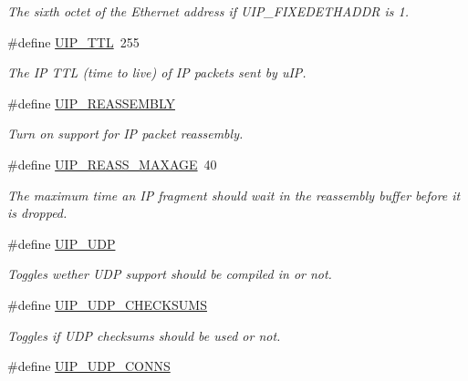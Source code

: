 \begin{CompactItemize}
\begin{CompactList}\small\item\em The sixth octet of the Ethernet address if UIP\_\-FIXEDETHADDR is 1. \item\end{CompactList}\item 
\#define \hyperlink{a00072_gb61381673de27f31848c5396bf0b338e}{UIP\_\-TTL}~255
\begin{CompactList}\small\item\em The IP TTL (time to live) of IP packets sent by u\-IP. \item\end{CompactList}\item 
\#define \hyperlink{a00072_gf963fdea2b75d27ef31e92d1d01359ee}{UIP\_\-REASSEMBLY}
\begin{CompactList}\small\item\em Turn on support for IP packet reassembly. \item\end{CompactList}\item 
\hypertarget{a00072_gc3882366feda1cb759ccbfe98327a7db}{
\#define \hyperlink{a00072_gc3882366feda1cb759ccbfe98327a7db}{UIP\_\-REASS\_\-MAXAGE}~40}
\label{a00072_gc3882366feda1cb759ccbfe98327a7db}

\begin{CompactList}\small\item\em The maximum time an IP fragment should wait in the reassembly buffer before it is dropped. \item\end{CompactList}\item 
\hypertarget{a00073_gdcf372ff9748996f7c05e9822a615384}{
\#define \hyperlink{a00073_gdcf372ff9748996f7c05e9822a615384}{UIP\_\-UDP}}
\label{a00073_gdcf372ff9748996f7c05e9822a615384}

\begin{CompactList}\small\item\em Toggles wether UDP support should be compiled in or not. \item\end{CompactList}\item 
\#define \hyperlink{a00073_g92f3344ec8ca46893163399c89fafed5}{UIP\_\-UDP\_\-CHECKSUMS}
\begin{CompactList}\small\item\em Toggles if UDP checksums should be used or not. \item\end{CompactList}\item 
\hypertarget{a00073_g196379ceb1219a99f4495e41ccc9bbfb}{
\#define \hyperlink{a00073_g196379ceb1219a99f4495e41ccc9bbfb}{UIP\_\-UDP\_\-CONNS}}
\label{a00073_g196379ceb1219a99f4495e41ccc9bbfb}


\end{CompactItemize}
